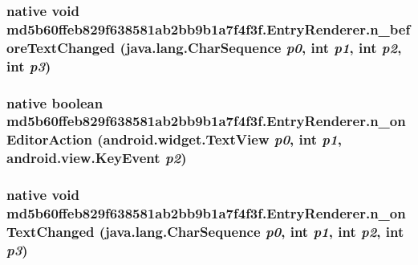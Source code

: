 \hypertarget{classmd5b60ffeb829f638581ab2bb9b1a7f4f3f_1_1_entry_renderer_5e50e6e61a8fdcb222dfa9c050b9be15}{
\subsubsection[{n\_\-beforeTextChanged}]{\setlength{\rightskip}{0pt plus 5cm}native void md5b60ffeb829f638581ab2bb9b1a7f4f3f.EntryRenderer.n\_\-beforeTextChanged (java.lang.CharSequence {\em p0}, \/  int {\em p1}, \/  int {\em p2}, \/  int {\em p3})}}
\label{classmd5b60ffeb829f638581ab2bb9b1a7f4f3f_1_1_entry_renderer_5e50e6e61a8fdcb222dfa9c050b9be15}


\hypertarget{classmd5b60ffeb829f638581ab2bb9b1a7f4f3f_1_1_entry_renderer_44c5149ccd87fb1b791211a11c6dd8ee}{
\subsubsection[{n\_\-onEditorAction}]{\setlength{\rightskip}{0pt plus 5cm}native boolean md5b60ffeb829f638581ab2bb9b1a7f4f3f.EntryRenderer.n\_\-onEditorAction (android.widget.TextView {\em p0}, \/  int {\em p1}, \/  android.view.KeyEvent {\em p2})}}
\label{classmd5b60ffeb829f638581ab2bb9b1a7f4f3f_1_1_entry_renderer_44c5149ccd87fb1b791211a11c6dd8ee}


\hypertarget{classmd5b60ffeb829f638581ab2bb9b1a7f4f3f_1_1_entry_renderer_7ee8490c38f7d8a07c71c77cd5f9b329}{
\subsubsection[{n\_\-onTextChanged}]{\setlength{\rightskip}{0pt plus 5cm}native void md5b60ffeb829f638581ab2bb9b1a7f4f3f.EntryRenderer.n\_\-onTextChanged (java.lang.CharSequence {\em p0}, \/  int {\em p1}, \/  int {\em p2}, \/  int {\em p3})}}
\label{classmd5b60ffeb829f638581ab2bb9b1a7f4f3f_1_1_entry_renderer_7ee8490c38f7d8a07c71c77cd5f9b329}


